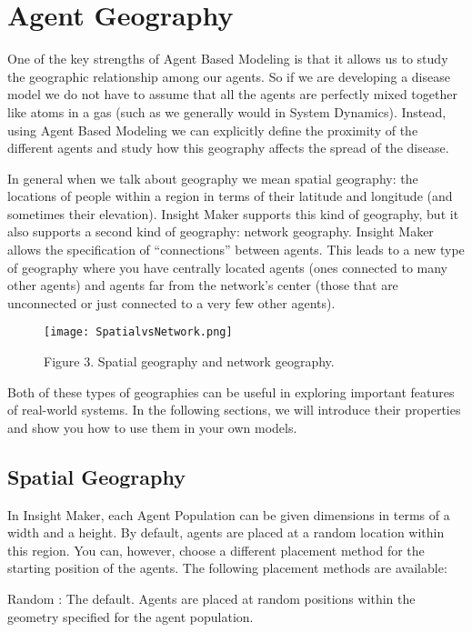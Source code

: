 \documentclass[]{memoir}
\let\Oldincludegraphics\includegraphics
\renewcommand{\includegraphics}[1]{\Oldincludegraphics[max size={\textwidth}{\textheight}]{#1}}
\begin{document}
\section{Agent Geography}

One of the key strengths of Agent Based Modeling is that it allows us to
study the geographic relationship among our agents. So if we are
developing a disease model we do not have to assume that all the agents
are perfectly mixed together like atoms in a gas (such as we generally
would in System Dynamics). Instead, using Agent Based Modeling we can
explicitly define the proximity of the different agents and study how
this geography affects the spread of the disease.

In general when we talk about geography we mean spatial geography: the
locations of people within a region in terms of their latitude and
longitude (and sometimes their elevation). Insight Maker supports this
kind of geography, but it also supports a second kind of geography:
network geography. Insight Maker allows the specification of
``connections'' between agents. This leads to a new type of geography
where you have centrally located agents (ones connected to many other
agents) and agents far from the network's center (those that are
unconnected or just connected to a very few other agents).

\begin{figure}[htbp]
\centering
\texttt{[image: SpatialvsNetwork.png]}
\caption{Figure 3. Spatial geography and network geography.}
\end{figure}

Both of these types of geographies can be useful in exploring important
features of real-world systems. In the following sections, we will
introduce their properties and show you how to use them in your own
models.

\subsection{Spatial Geography}

In Insight Maker, each Agent Population can be given dimensions in terms
of a width and a height. By default, agents are placed at a random
location within this region. You can, however, choose a different
placement method for the starting position of the agents. The following
placement methods are available:

Random : The default. Agents are placed at random positions within the
geometry specified for the agent population.
\end{document}
